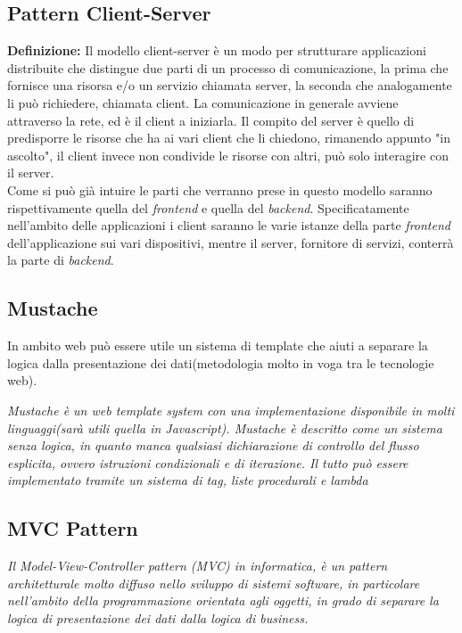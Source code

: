 \subsection{Pattern Client-Server}
\textbf{Definizione:} Il modello client-server è un modo per strutturare applicazioni distribuite che distingue due parti di un processo di comunicazione, la prima che fornisce una risorsa e/o un servizio chiamata server, la seconda che analogamente li può richiedere, chiamata client. La comunicazione in generale avviene attraverso la rete, ed è il client a iniziarla. Il compito del server è quello di predisporre le risorse che ha ai vari client che li chiedono, rimanendo appunto "in ascolto", il client invece non condivide le risorse con altri, può solo interagire con il server\cite{wiki:cliserv}.\\

Come si può già intuire le parti che verranno prese in questo modello saranno rispettivamente quella del \emph{frontend} e quella del \emph{backend}. Specificatamente nell'ambito delle applicazioni i client saranno le varie istanze della parte \emph{frontend} dell'applicazione sui vari dispositivi, mentre il server, fornitore di servizi, conterrà la parte di \emph{backend}.

\subsection{Mustache}

In ambito web può essere utile un sistema di template che aiuti a separare la logica dalla presentazione dei dati(metodologia molto in voga tra le tecnologie web).

\emph{Mustache è un web template system con una implementazione disponibile in molti linguaggi(sarà utili quella in Javascript). Mustache è descritto come un sistema senza logica, in quanto manca qualsiasi dichiarazione di controllo del flusso esplicita, ovvero istruzioni condizionali e di iterazione. Il tutto può essere implementato tramite un sistema di tag, liste procedurali e lambda}
\hspace*{\fill}\cite{wiki:mustache}

\subsection{MVC Pattern}
\label{sec:MVC}
\emph{Il Model-View-Controller pattern (MVC) in informatica, è un pattern architetturale molto diffuso nello sviluppo di sistemi software, in particolare nell'ambito della programmazione orientata agli oggetti, in grado di separare la logica di presentazione dei dati dalla logica di business.}

